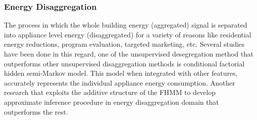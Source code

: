 \documentclass[conference]{IEEEtran}
\begin{document}

\subsubsection{Energy Disaggregation}
The process in which the whole building energy (aggregated) signal is separated into appliance level energy (disaggregated) for a variety of reasons like residential energy reductions, program evaluation, targeted marketing, etc. Several studies have been done in this regard, one of the unsupervised desegregation method \cite{DisaggregationHSMM} that outperforms other unsupervised disaggregation methods is conditional factorial hidden semi-Markov model. This model when integrated with other features, accurately represents the individual appliance energy consumption. Another research \cite{KolterJ12} that exploits the additive structure of the FHMM to develop approximate inference procedure in  energy disaggregation domain that outperforms the rest.
\end{document}

